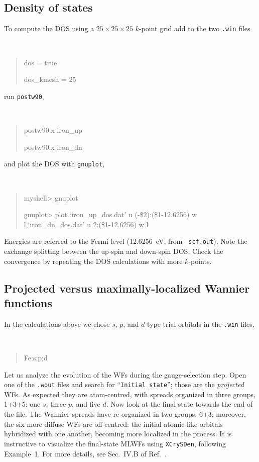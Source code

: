 \documentclass[a4paper,11pt,twoside]{article}
\begin{document}
\subsection*{Density of states}

To compute the DOS using a $25\times 25 \times 25$ $k$-point grid add
to the two {\tt .win} files
%
{\tt
\begin{quote}
dos = true

dos\_kmesh = 25
\end{quote}
}
%
run {\tt postw90},
%
{\tt
\begin{quote}
postw90.x iron\_up

postw90.x iron\_dn
\end{quote}
}
%
and plot the DOS with {\tt gnuplot},
%
{\tt
\begin{quote}
myshell> gnuplot

gnuplot> plot `iron\_up\_dos.dat' u (-\$2):(\$1-12.6256) w l,`iron\_dn\_dos.dat' u 2:(\$1-12.6256) w l

\end{quote} 
}
%
Energies are referred to the Fermi level (12.6256~eV, from {\tt
  scf.out}).  Note the exchange splitting between the up-spin and
down-spin DOS. Check the convergence by repeating the DOS calculations
with more $k$-points.

\subsection*{Projected versus maximally-localized Wannier functions}

In the calculations above we chose $s$, $p$, and $d$-type trial
orbitals in the {\tt .win} files,
%
{\tt
\begin{quote}
Fe:s;p;d
\end{quote}
}
%
Let us analyze the evolution of the WFs during the gauge-selection
step. Open one of the {\tt .wout} files and search for ``{\tt Initial
  state}''; those are the {\it projected} WFs. As expected they are
atom-centred, with spreads organized in three groups, 1+3+5: one $s$,
three $p$, and five $d$.  Now look at the final state towards the end
of the file.  The Wannier spreads have re-organized in two groups,
6+3; moreover, the six more diffuse WFs are off-centred: the initial
atomic-like orbitals hybridized with one another, becoming more
localized in the process. It is instructive to visualize the
final-state MLWFs using {\tt XCrySDen}, following Example~1. For more
details, see Sec.~IV.B of Ref.~\cite{wang-prb06}.
\end{document}
